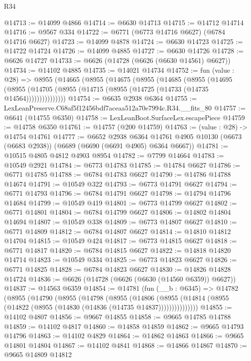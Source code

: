 \begin{lexlean}{R34}
\begin{coremodule}
@14713 := @14099 @4866
@14714 := @6630 @14713
@14715 := @14712 @14714
@14716 := @9567 @334
@14722 := @6771 (@6773 @14716 @6627) (@6784 @14716 @6627)
@14723 := @14099 @4878
@14724 := @6630 @14723
@14725 := @14722 @14724
@14726 := @14099 @4885
@14727 := @6630 @14726
@14728 := @6626 @14727
@14733 := @6626 (@14728 (@6626 (@6630 @14561) @6627))
@14734 := @14102 @4885
@14735 := @14021 @14734
@14752 := fun (value : @28) =>
  @8955
    (@14665
      (@8955
        (@14675
          (@8955
            (@14685
              (@8955
                (@14695
                  (@8955 (@14705 (@8955 (@14715 (@8955 (@14725 (@14733 (@14735 @14564)))))))))))))))
@14754 := @6635 @2938 @6364
@14755 := LexLeanPreserve.C68af5f12456bdf7aceaa512a70e7994c.R34.__fits_80
@14757 := @6641 (@14755 @6350)
@14758 := LexLeanBoot.SurfaceLex.escapePiece
@14759 := @14758 @6350
@14761 := @14757 (@200 @14759)
@14763 := (value : @28) -> @14754 @14761
@14777 := @6652
    @2938
    @6364
    @14761
    @4905
    @10130
    (@6673 (@6683 @2938))
    (@6689 (@6690 (@6691 @4905) @6364 @6667))
@14781 := @10515 @4805 @4812 @4903 @8954
@14782 := @7799 @14664
@14783 := @10549 @2921
@14784 := @6773 @14783
@14785 := @14784 @6627
@14786 := @6771 @14785
@14788 := @6784 @14783 @6627
@14790 := @14786 @14788 @14674
@14791 := @10549 @322
@14793 := @6773 @14791 @6627
@14794 := @6771 @14793
@14796 := @6784 @14791 @6627
@14798 := @14794 @14796 @14684
@14799 := @10549 @419
@14801 := @6773 @14799 @6627
@14802 := @6771 @14801
@14804 := @6784 @14799 @6627
@14806 := @14802 @14804 @14694
@14807 := @10549 @338
@14809 := @6773 @14807 @6627
@14810 := @6771 @14809
@14812 := @6784 @14807 @6627
@14814 := @14810 @14812 @14704
@14815 := @10549 @424
@14817 := @6773 @14815 @6627
@14818 := @6771 @14817
@14820 := @6784 @14815 @6627
@14822 := @14818 @14820 @14714
@14823 := @10549 @334
@14825 := @6773 @14823 @6627
@14826 := @6771 @14825
@14828 := @6784 @14823 @6627
@14830 := @14826 @14828 @14724
@14836 := @6626 (@14728 (@6626 (@6630 (@14560 @6359)) @6627))
@14837 := @14563 @6359
@14854 := @14781
    (fun (__b : @6345) =>
    @14782
      (@8955
        (@14790
          (@8955
            (@14798
              (@8955
                (@14806
                  (@8955 (@14814 (@8955 (@14822 (@8955 (@14830 (@14836 (@14735 @14837)))))))))))))))
@14855 := @14102 @4807
@14856 := @9667 @14855
@14858 := @9665 @14785 @14788
@14859 := @14102 @4817
@14860 := @14858 @14859
@14862 := @9665 @14793 @14796
@14863 := @14102 @4829
@14864 := @14862 @14863
@14866 := @9665 @14801 @14804
@14867 := @14102 @4841
@14868 := @14866 @14867
@14870 := @9665 @14809 @14812

\end{coremodule}
\end{lexlean}
